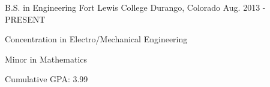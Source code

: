 \begin{cventries}
  \cventry
    {B.S. in Engineering}
    {Fort Lewis College}
    {Durango, Colorado}
    {Aug. 2013 - PRESENT}
    {
      \begin{cvitems}
        \item {Concentration in Electro/Mechanical Engineering}
        \item {Minor in Mathematics}
        \item {Cumulative GPA: 3.99}
      \end{cvitems}
    }

\end{cventries}
